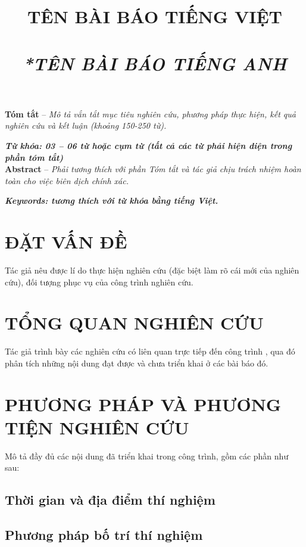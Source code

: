 \documentclass[a4paper,journal,11pt]{IEEEtran}
\title{\Large\bf
\changefontsizes{16pt}TÊN BÀI BÁO TIẾNG VIỆT
\normalfont
\\
\Large \changefontsizes{14pt} \textit{\\*TÊN BÀI BÁO TIẾNG ANH}
}
\begin{document}
\pagestyle{fancy}
\fancyhf{}
\cfoot{\thepage}
\maketitle
\renewcommand\headrule{}

\textbf{Tóm tắt} -- \textit {Mô tả vắn tắt mục tiêu nghiên cứu, phương pháp thực hiện, kết quả nghiên cứu và kết luận (khoảng 150-250 từ).}
	
\textbf{\textit {Từ khóa: 03 – 06 từ hoặc cụm từ (tất cả các
từ phải hiện diện trong phần tóm tắt)}}\\

\textbf{Abstract} -- \textit {Phải tương thích với phần Tóm tắt và tác giả chịu trách nhiệm hoàn toàn cho việc
biên dịch chính xác.}
	
\textbf{\textit {Keywords: tương thích với từ khóa bằng tiếng Việt.}}
\section{ĐẶT VẤN ĐỀ}
	Tác giả nêu được lí do thực hiện nghiên cứu (đặc biệt làm rõ cái mới của nghiên cứu), đối tượng phục vụ của công trình nghiên cứu.
\section{TỔNG QUAN NGHIÊN CỨU}
Tác giả trình bày các nghiên cứu có liên quan trực tiếp đến công trình \cite{thuan}, qua đó phân tích những nội dung đạt được và chưa triển khai ở các bài báo đó.
\section{PHƯƠNG PHÁP VÀ PHƯƠNG TIỆN NGHIÊN CỨU}
Mô tả đầy đủ các nội dung đã triển khai trong công trình, gồm các phần như sau:
\subsection{Thời gian và địa điểm thí nghiệm}
\subsection{Phương pháp bố trí thí nghiệm}
\end{document}
